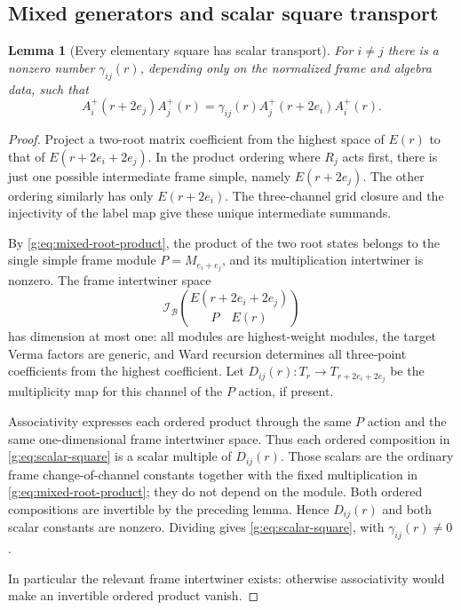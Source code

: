 \documentclass[11pt,a4paper]{article}
\numberwithin{equation}{section}
\newtheorem{lemma}[theorem]{Lemma}
\theoremstyle{definition}\newtheorem{definition}[theorem]{Definition}
\theoremstyle{remark}\newtheorem{remark}[theorem]{Remark}
\begin{document}
\subsection{Mixed generators and scalar square transport}
\begin{lemma}[Every elementary square has scalar transport]
\label{g:lem:scalar-squares}
For $i\ne j$ there is a nonzero number $\gamma_{ij}(r)$, depending
only on the normalized frame and algebra data, such that
\begin{equation}
 A_i^+(r+2e_j)A_j^+(r)
     =\gamma_{ij}(r)A_j^+(r+2e_i)A_i^+(r).           \label{g:eq:scalar-square}
\end{equation}
\end{lemma}
\begin{proof}
Project a two-root matrix coefficient from the highest space of
$E(r)$ to that of $E(r+2e_i+2e_j)$. In the product ordering where
$R_j$ acts first, there is just one possible intermediate frame
simple, namely $E(r+2e_j)$. The other ordering similarly has only
$E(r+2e_i)$. The three-channel grid closure and the injectivity of the label
map give these unique intermediate summands.

By \eqref{g:eq:mixed-root-product}, the product of the two root states belongs to the single
simple frame module $P=M_{e_i+e_j}$, and its multiplication
intertwiner is nonzero. The frame intertwiner space
\[
 \mathcal I_{\mathcal B}\binom{E(r+2e_i+2e_j)}{P\quad E(r)}
\]
has dimension at most one: all modules are highest-weight modules,
the target Verma factors are generic, and Ward recursion determines
all three-point coefficients from the highest coefficient. Let
$D_{ij}(r):T_r\to T_{r+2e_i+2e_j}$ be the multiplicity map for
this channel of the $P$ action, if present.

Associativity expresses each ordered product through the same
$P$ action and the same one-dimensional frame intertwiner space.
Thus each ordered composition in \eqref{g:eq:scalar-square} is a scalar multiple of
$D_{ij}(r)$. Those scalars are the ordinary frame change-of-channel
constants together with the fixed multiplication in \eqref{g:eq:mixed-root-product}; they do
not depend on the module. Both ordered compositions are invertible
by the preceding lemma. Hence $D_{ij}(r)$ and both scalar constants
are nonzero. Dividing gives \eqref{g:eq:scalar-square}, with $\gamma_{ij}(r)\ne0$.

In particular the relevant frame intertwiner exists: otherwise
associativity would make an invertible ordered product vanish.
\end{proof}
\end{document}

